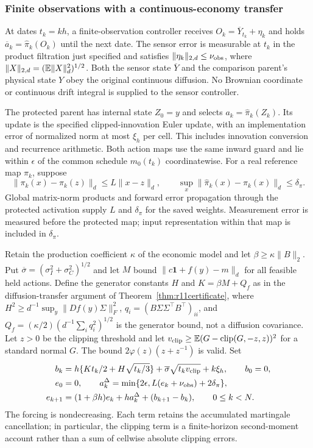 \subsubsection{Finite observations with a continuous-economy transfer}
\label{sec:r14sensing}
At dates $t_k=kh$, a finite-observation controller receives
$O_k=\overline Y_{t_k}+\eta_k$ and holds
$\overline a_k=\widehat\pi_k(O_k)$ until the next date. The sensor
error is measurable at $t_k$ in the product filtration just specified
and satisfies $\|\eta_k\|_{2,d}\leq\nu_{\rm obs}$, where
$\|X\|_{2,d}=(\mathbb E\|X\|_d^2)^{1/2}$. Both the sensor state
$\overline Y$ and the comparison parent's physical state $Y$ obey the
original continuous diffusion. No Brownian coordinate or continuous
drift integral is supplied to the sensor controller.

The protected parent has internal state $Z_0=y$ and selects
$a_k=\widehat\pi_k(Z_k)$. Its update is the specified clipped-innovation
Euler update, with an implementation error of normalized norm at most
$\xi_h$ per cell. This includes innovation conversion and recurrence
arithmetic. Both action maps use the same inward guard and lie within
$\epsilon$ of the common schedule $m_0(t_k)$ coordinatewise.
For a real reference map $\pi_k$, suppose
\[
 \|\pi_k(x)-\pi_k(z)\|_d\leq L\|x-z\|_d,
 \qquad \sup_x\|\widehat\pi_k(x)-\pi_k(x)\|_d\leq\delta_\pi.
\]
Global matrix-norm products and forward error propagation through the
protected activation supply $L$ and $\delta_\pi$ for the saved weights.
Measurement error is measured before the protected map; input
representation within that map is included in $\delta_\pi$.

Retain the production coefficient $\kappa$ of the economic model and
let $\beta\geq\kappa\|B\|_2$. Put
$\overline\sigma=(\sigma_I^2+\sigma_C^2)^{1/2}$ and let $M$ bound
$\|c\bm1+f(y)-m\|_d$ for all feasible held actions. Define the
generator constants $H$ and $K=\beta M+Q_f$ as in the diffusion-transfer argument of Theorem~\ref{thm:r11certificate},
where $H^2\geq d^{-1}\sup_y\|Df(y)\Sigma\|_F^2$, $q_i=(B\Sigma\Sigma^\top B^\top)_{ii}$, and $Q_f=(\kappa/2)(d^{-1}\sum_iq_i^2)^{1/2}$ is the generator
bound, not a diffusion covariance. Let $z>0$ be the clipping threshold and let
$v_{\rm clip}\geq\mathbb E(G-\operatorname{clip}(G,-z,z))^2$ for a standard normal
$G$. The bound $2\varphi(z)(z+z^{-1})$ is valid.
Set
\begin{align}
 b_k&=h\{Kt_k/2+H\sqrt{t_k/3}\}
          +\overline\sigma\sqrt{t_kv_{\rm clip}}+k\xi_h,
          \qquad b_0=0,\label{eq:r14sensorforcing}\\
 e_0&=0,\qquad
 a_k^\Delta=\min\{2\epsilon,L(e_k+\nu_{\rm obs})+2\delta_\pi\},\notag\\
 e_{k+1}&=(1+\beta h)e_k+h a_k^\Delta+(b_{k+1}-b_k),
       \qquad 0\leq k<N.\label{eq:r14sensorrecursion}
\end{align}
The forcing is nondecreasing. Each term retains the accumulated
martingale cancellation; in particular, the clipping term is a
finite-horizon second-moment account rather than a sum of cellwise
absolute clipping errors.

